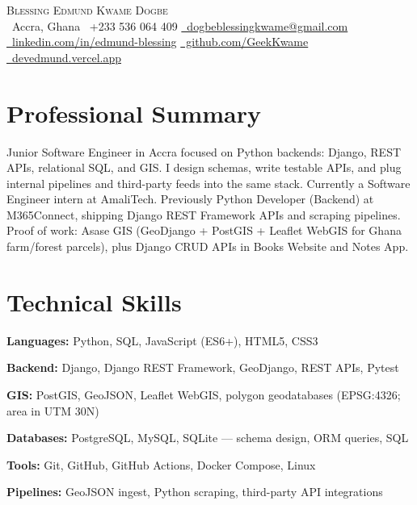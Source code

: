 \documentclass[letterpaper,11pt]{article}
\begin{document}

\begin{center}
  {\Huge \scshape Blessing Edmund Kwame Dogbe}\\[5pt]
  \small
  \faMapMarker*\ Accra, Ghana \quad
  \faPhone\ +233 536 064 409 \quad
  \href{mailto:dogbeblessingkwame@gmail.com}{\faEnvelope\ dogbeblessingkwame@gmail.com}\\[3pt]
  \href{https://linkedin.com/in/edmund-blessing}{\faLinkedin\ linkedin.com/in/edmund-blessing} \quad
  \href{https://github.com/GeekKwame}{\faGithub\ github.com/GeekKwame} \quad
  \href{https://devedmund.vercel.app/}{\faGlobe\ devedmund.vercel.app}
\end{center}

\section{Professional Summary}
Junior Software Engineer in Accra focused on Python backends: Django, REST APIs, relational SQL, and GIS. I design schemas, write testable APIs, and plug internal pipelines and third-party feeds into the same stack. Currently a Software Engineer intern at AmaliTech. Previously Python Developer (Backend) at M365Connect, shipping Django REST Framework APIs and scraping pipelines. Proof of work: Asase GIS (GeoDjango + PostGIS + Leaflet WebGIS for Ghana farm/forest parcels), plus Django CRUD APIs in Books Website and Notes App.

\section{Technical Skills}
\begin{itemize}[leftmargin=0in, label={}, itemsep=2pt]
  \small{
  \item \textbf{Languages:} Python, SQL, JavaScript (ES6+), HTML5, CSS3
  \item \textbf{Backend:} Django, Django REST Framework, GeoDjango, REST APIs, Pytest
  \item \textbf{GIS:} PostGIS, GeoJSON, Leaflet WebGIS, polygon geodatabases (EPSG:4326; area in UTM 30N)
  \item \textbf{Databases:} PostgreSQL, MySQL, SQLite --- schema design, ORM queries, SQL
  \item \textbf{Tools:} Git, GitHub, GitHub Actions, Docker Compose, Linux
  \item \textbf{Pipelines:} GeoJSON ingest, Python scraping, third-party API integrations
  }
\end{itemize}
\end{document}
